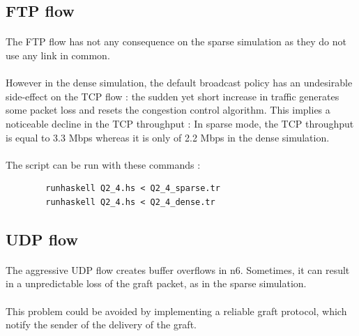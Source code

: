 \documentclass[a4paper]{article}
\begin{document}
  \subsection{FTP flow}

    \paragraph{}The FTP flow has not any consequence on the sparse simulation as
they do not use any link in common.

    \paragraph{}However in the dense simulation, the default broadcast policy
has an undesirable side-effect on the TCP flow : the sudden yet short increase
in traffic generates some packet loss and resets the congestion control
algorithm. This implies a noticeable decline in the TCP throughput :
\newline In sparse mode, the TCP throughput is equal to 3.3 Mbps whereas it is
only of 2.2 Mbps in the dense simulation.

    \paragraph{}The script can be run with these commands :
    \begin{verbatim}
        runhaskell Q2_4.hs < Q2_4_sparse.tr
        runhaskell Q2_4.hs < Q2_4_dense.tr
    \end{verbatim}

  \subsection{UDP flow}

    \paragraph{}The aggressive UDP flow creates buffer overflows in n6.
Sometimes, it can result in a unpredictable loss of the graft packet, as in
the sparse simulation.

    \paragraph{}This problem could be avoided by implementing a reliable
graft protocol, which notify the sender of the delivery of the graft.
\end{document}
